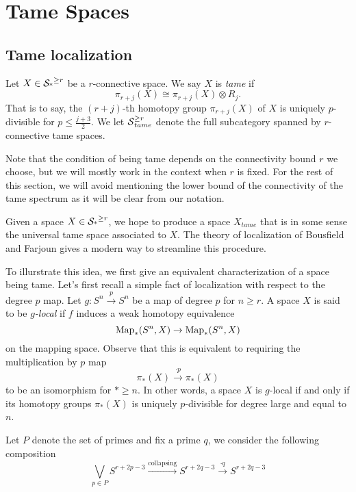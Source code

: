 \section{Tame Spaces}

\subsection{Tame localization}

\begin{definition}
	\label{Tame spaces}
	Let $X\in \operatorname{\mathcal{S}_{*}}^{\geq r}$ be a $r$-connective space.
	We say $X$ is \emph{tame} if 
	\[
	\pi_{r+j}(X)\cong \pi_{r+j}(X)\otimes R_{j}.
	\]
	That is to say, the $(r+j)$-th homotopy group $\pi_{r+j}(X)$ of $X$ is uniquely $p$-divisible for $p\leq \frac{j+3}{2}$. We let $\operatorname{\mathcal{S}}^{\geq r}_{tame}$ denote the full subcategory spanned by $r$-connective tame spaces.
\end{definition}

\begin{remark}
Note that the condition of being tame depends on the connectivity bound $r$ we choose, but we will mostly work in the context when $r$ is fixed.
	For the rest of this section, we will avoid mentioning the lower bound of the connectivity of the tame spectrum as it will be clear from our notation.	
	\end{remark}
Given a space $X\in \operatorname{\mathcal{S}_{*}}^{\geq r}$, we hope to produce a space $X_{tame}$ that is in some sense the universal tame space associated to $X$.
The theory of localization of Bousfield and Farjoun gives a modern way to streamline this procedure.

To illurstrate this idea, we first give an equivalent characterization of a space being tame.
Let's first recall a simple fact of localization with respect to the degree $p$ map.
Let $g:S^n \xrightarrow{p}S^n$ be a map of degree $p$ for $n\geq r$. A space $X$ is said to be \emph{$g$-local} if $f$ induces a weak homotopy equivalence 
\[
\operatorname{Map}_*(S^n,X) \to \operatorname{Map}_*(S^n,X)
\]
on the mapping space. Observe that this is equivalent to requiring the multiplication by $p$ map
\[
\pi_{*}(X) \xrightarrow{\cdot p} \pi_{*}(X)
\]
to be an isomorphism for $*\geq n$. In other words, a space $X$ is $g$-local if and only if its homotopy groups $\pi_*(X)$ is uniquely $p$-divisible for degree large and equal to $n$.

Let $P$ denote the set of primes and fix a prime $q$, we consider the following composition 
\[
\bigvee_{p \in P}S^{r+2p-3} \xrightarrow{\text{collapsing}} S^{r+2q-3} 
\xrightarrow{\cdot q} S^{r+2q-3}
\]


